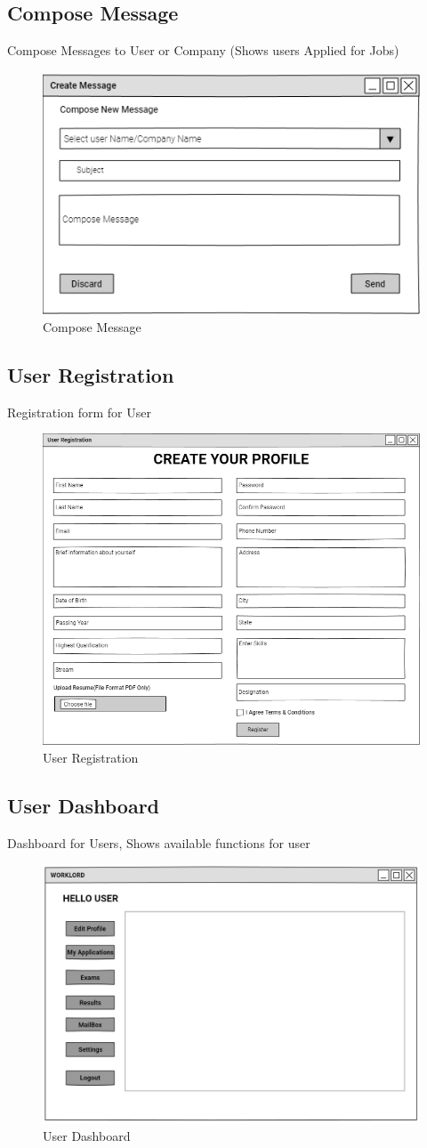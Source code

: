 \documentclass[a4paper,12pt]{report}
\begin{document}
\subsection {Compose Message}
Compose Messages to User or Company (Shows users Applied for Jobs)
\begin{figure}[bph]
	\centering
	\includegraphics[width=.5\linewidth]{img/create_msg}
	\caption{Compose Message}
\end{figure}
\subsection {User Registration}
Registration form for User
\begin{figure}[bph]
	\centering
	\includegraphics[width=.6\linewidth ]{img/user/user_registration}
	\caption{User Registration}
\end{figure}
\pagebreak

\subsection { User Dashboard}
Dashboard for Users, Shows available functions for user
\begin{figure}[bph]
	\centering
	\includegraphics[width=.8\linewidth]{img/user/userhme}
	\caption{User Dashboard}
\end{figure}
\pagebreak
\end{document}
